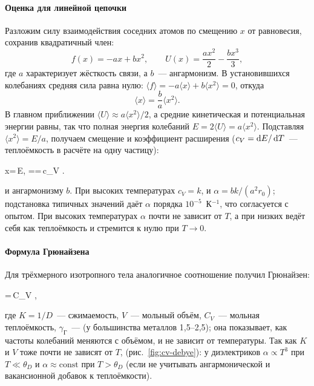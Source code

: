 \paragraph{Оценка для линейной цепочки}
Разложим силу взаимодействия соседних атомов по смещению $x$ от равновесия,
сохранив квадратичный член:
\[
f(x)=-ax+bx^2,\qquad U(x)=\frac{ax^2}{2}-\frac{bx^3}{3},
\]
где $a$ характеризует жёсткость связи, а $b$~— ангармонизм. В
установившихся колебаниях средняя сила равна нулю:
$\langle f\rangle=-a\langle x\rangle+b\langle x^2\rangle=0$, откуда
\[
\langle x\rangle=\frac ba\langle x^2\rangle .
\]
В главном приближении $\langle U\rangle\approx a\langle x^2\rangle/2$, а
средние кинетическая и потенциальная энергии равны, так что полная
энергия колебаний $E=2\langle U\rangle=a\langle x^2\rangle$. Подставляя
$\langle x^2\rangle=E/a$, получаем смещение и коэффициент расширения
($c_V=\mathop{}\!\mathrm{d} E/\mathop{}\!\mathrm{d} T$~— теплоёмкость в расчёте на одну частицу):
\begin{keyeq}\label{eq:alpha-chain}
\langle x\rangle=\,E,\qquad
\alpha==\,c_V .
\end{keyeq}
 и
ангармонизму $b$. При высоких температурах $c_V=k$, и
$\alpha=bk/(a^2r_0)$; подстановка типичных значений даёт $\alpha$ порядка
$10^{-5}$~К$^{-1}$, что согласуется с опытом. При высоких температурах
$\alpha$ почти не зависит от $T$, а при низких ведёт себя как теплоёмкость
и стремится к нулю при $T\to0$.

\paragraph{Формула Грюнайзена}
Для трёхмерного изотропного тела аналогичное соотношение получил
Грюнайзен:
\begin{keyeq}\label{eq:gruneisen}
\alpha=\,C_V ,
\end{keyeq}
где $K=1/D$~— сжимаемость, $V$~— мольный объём, $C_V$~— мольная
теплоёмкость, $\gamma_\text{Г}$~—  (у
большинства металлов 1,5--2,5); она показывает, как частоты колебаний
меняются с объёмом, и не зависит от температуры. Так как $K$ и $V$ тоже
почти не зависят от $T$,  (рис.~\ref{fig:cv-debye}): у диэлектриков $\alpha\propto T^3$ при
$T\ll\theta_D$ и $\alpha\approx\text{const}$ при $T>\theta_D$ (если не учитывать
ангармонической и вакансионной добавок к теплоёмкости).

